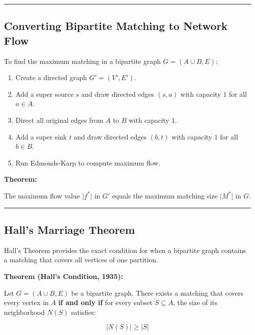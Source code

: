 \documentclass[
]{book}
\providecommand{\tightlist}{%
  \setlength{\itemsep}{0pt}\setlength{\parskip}{0pt}}
\theoremstyle{definition}
\theoremstyle{definition}
\theoremstyle{definition}
\theoremstyle{definition}
\theoremstyle{remark}
\begin{document}
\begin{center}\rule{0.5\linewidth}{0.5pt}\end{center}

\subsection{Converting Bipartite Matching to Network Flow}\label{converting-bipartite-matching-to-network-flow}

To find the maximum matching in a bipartite graph \(G = (A \cup B, E)\):

\begin{enumerate}
\def\labelenumi{\arabic{enumi}.}
\tightlist
\item
  Create a directed graph \(G' = (V', E')\).
\item
  Add a super source \(s\) and draw directed edges \((s, a)\) with capacity \(1\) for all \(a \in A\).
\item
  Direct all original edges from \(A\) to \(B\) with capacity \(1\).
\item
  Add a super sink \(t\) and draw directed edges \((b, t)\) with capacity \(1\) for all \(b \in B\).
\item
  Run Edmonds-Karp to compute maximum flow.
\end{enumerate}

\textbf{Theorem:}

The maximum flow value \(\vert{}f^*\vert{}\) in \(G'\) equals the maximum matching size \(\vert{}M^*\vert{}\) in \(G\).

\begin{center}\rule{0.5\linewidth}{0.5pt}\end{center}

\subsection{Hall's Marriage Theorem}\label{halls-marriage-theorem}

Hall's Theorem provides the exact condition for when a bipartite graph contains a matching that covers all vertices of one partition.

\textbf{Theorem (Hall's Condition, 1935):}

Let \(G = (A \cup B, E)\) be a bipartite graph. There exists a matching that covers every vertex in \(A\) \textbf{if and only if} for every subset \(S \subseteq A\), the size of its neighborhood \(N(S)\) satisfies:

\[\vert{}N(S)\vert{} \ge \vert{}S\vert{}\]
\end{document}
